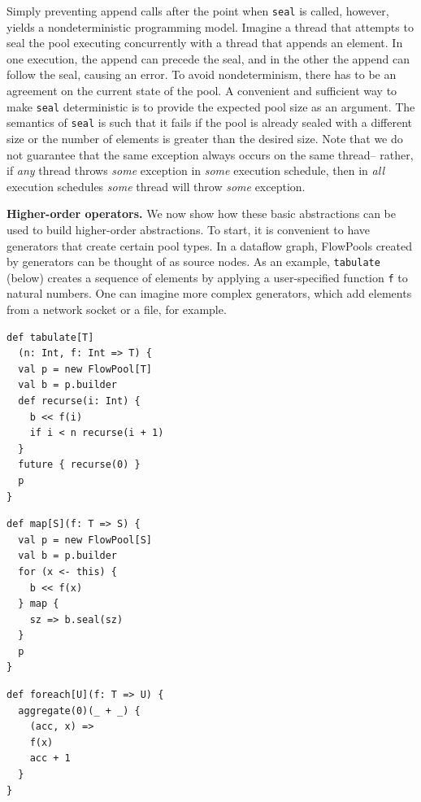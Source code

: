 Simply preventing append calls
after the point when \verb=seal= is called, however, yields a
nondeterministic programming model.
Imagine a thread that attempts to seal the pool executing concurrently
with a thread that appends an element.
In one execution, the append can precede the seal, and in the other
the append can follow the seal, causing an error.
To avoid nondeterminism, there has to be an agreement on the
current state of the pool.
A convenient and sufficient way to make \verb=seal= deterministic
is to provide the expected pool size as an argument.
The semantics of \verb=seal= is such that it fails if the pool
is already sealed with a different size or the number of elements
is greater than the desired size. Note that we do not guarantee that the
same exception always occurs on the same thread-- rather,
if \emph{any} thread throws \emph{some} exception in \emph{some} execution schedule,
then in \emph{all} execution schedules \emph{some} thread will throw \emph{some} exception.


\textbf{Higher-order operators.}
We now show how these basic abstractions can be used
to build higher-order abstractions.
To start, it is
convenient to have generators that create certain pool types.
In a dataflow graph, FlowPools created by generators
can be thought of as source nodes.
As an example, \verb=tabulate= (below) creates a sequence of elements
by applying a user-specified function \verb=f= to natural numbers.
One can imagine more complex generators, which add elements from a
network socket or a file, for example.

\noindent
\begin{minipage}[t]{5.2 cm}
\begin{verbatim}
def tabulate[T]
  (n: Int, f: Int => T) {
  val p = new FlowPool[T]
  val b = p.builder
  def recurse(i: Int) {
    b << f(i)
    if i < n recurse(i + 1)
  }
  future { recurse(0) }
  p
}
\end{verbatim}
\end{minipage}\begin{minipage}[t]{5 cm}
\begin{verbatim}
def map[S](f: T => S) {
  val p = new FlowPool[S]
  val b = p.builder
  for (x <- this) {
    b << f(x)
  } map {
    sz => b.seal(sz)
  }
  p
}
\end{verbatim}
\end{minipage}
\begin{minipage}[t]{4 cm}
\begin{verbatim}
def foreach[U](f: T => U) {
  aggregate(0)(_ + _) {
    (acc, x) =>
    f(x)
    acc + 1
  }
}
\end{verbatim}
\end{minipage}

